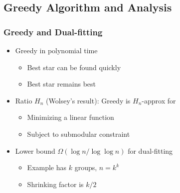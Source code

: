 \documentclass[hyperref,dvipsnames,svgnames,compress]{beamer}
\begin{document}
\subsection[Dual-fitting]{Greedy Algorithm and Analysis}
\begin{frame}
  \frametitle{Greedy and Dual-fitting}
  \begin{itemize}\addtolength{\itemsep}{1\baselineskip}
  \item Greedy in polynomial time
    \begin{itemize}
    \item Best star can be found quickly
    \item Best star remains best
    \end{itemize}
  \item Ratio $H_n$ (Wolsey's result):
    Greedy is $H_n$-approx for
    \begin{itemize}
    \item Minimizing a linear function
    \item Subject to submodular constraint
    \end{itemize}
  \item Lower bound $\Omega(\log n / \log\log n)$ for dual-fitting
    \begin{itemize}
    \item Example has $k$ groups, $n = k^k$
    \item Shrinking factor is $k/2$
    \end{itemize}
  \end{itemize}
\end{frame}
\end{document}
